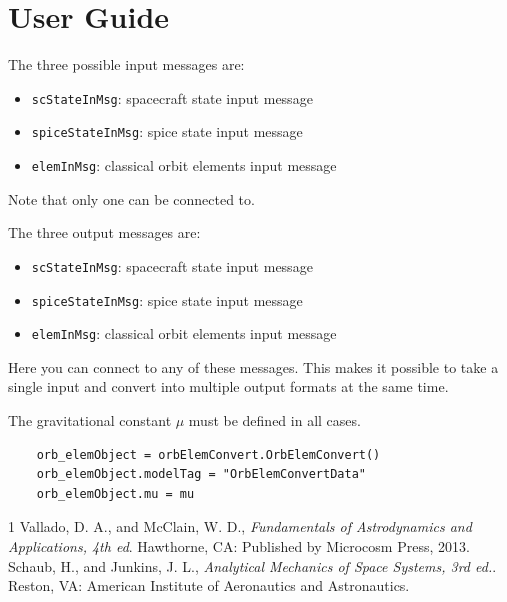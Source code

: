 \section{User Guide}
The three possible input messages are:
\begin{itemize}
	\item {\tt scStateInMsg}: spacecraft state input message
	\item {\tt spiceStateInMsg}: spice state input message
	\item {\tt elemInMsg}: classical orbit elements input message
\end{itemize}
Note that only one can be connected to.

The three output messages are:
\begin{itemize}
	\item {\tt scStateInMsg}: spacecraft state input message
	\item {\tt spiceStateInMsg}: spice state input message
	\item {\tt elemInMsg}: classical orbit elements input message
\end{itemize}
Here you can connect to any of these messages.  This makes it possible to take a single input and convert into multiple output formats at the same time.

The gravitational constant $\mu$ must be defined in all cases.
\begin{verbatim}
	orb_elemObject = orbElemConvert.OrbElemConvert()
	orb_elemObject.modelTag = "OrbElemConvertData"
	orb_elemObject.mu = mu
\end{verbatim}


\begin{thebibliography}{1}
	Vallado, D. A., and McClain, W. D., \textit{Fundamentals of Astrodynamics and Applications, 4th ed}. Hawthorne, CA: Published by Microcosm Press, 2013.
	Schaub, H., and Junkins, J. L., \textit{Analytical Mechanics of Space Systems, 3rd ed.}. Reston, VA: American Institute of Aeronautics and Astronautics.
\end{thebibliography}
